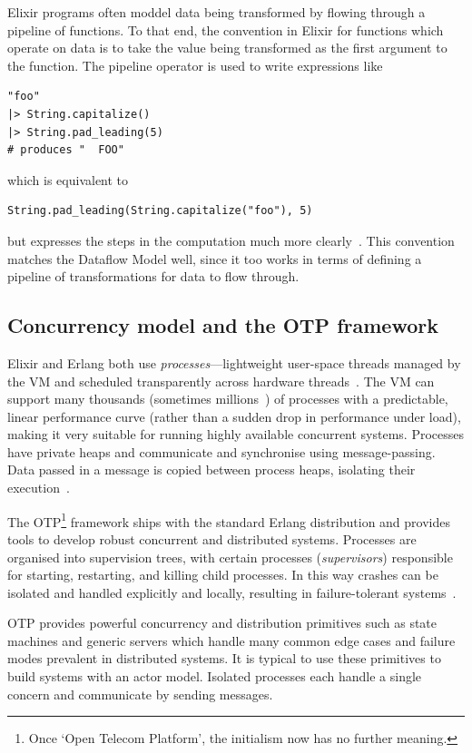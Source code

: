Elixir programs often moddel data being transformed by flowing through a pipeline of functions.
To that end, the convention in Elixir for functions which operate on data is to take the value being transformed as the first argument to the function.
The pipeline operator \exs{|>} is used to write expressions like
\begin{verbatim}
"foo"
|> String.capitalize()
|> String.pad_leading(5)
# produces "  FOO"
\end{verbatim}
which is equivalent to
\begin{verbatim}
String.pad_leading(String.capitalize("foo"), 5)		
\end{verbatim}
but expresses the steps in the computation much more clearly~\cite[p.~56]{Thomas:2016}.
This convention matches the Dataflow Model well, since it too works in terms of defining a pipeline of transformations for data to flow through.

\subsection{Concurrency model and the OTP framework}\label{sec:prep:elixir:otp}

Elixir and Erlang both use \emph{processes}---lightweight user-space threads managed by the VM and scheduled transparently across hardware threads~\cite[p.~185]{Thomas:2016}.
The VM can support many thousands (sometimes millions~\cite{elixir-2million-processes}) of processes with a predictable, linear performance curve (rather than a sudden drop in performance under load), making it very suitable for running highly available concurrent systems.
Processes have private heaps and communicate and synchronise using message-passing.
Data passed in a message is copied between process heaps, isolating their execution~\cite[p.~29]{scalability_erlang_otp}.

The OTP\footnote{
Once `Open Telecom Platform', the initialism now has no further meaning.
} framework ships with the standard Erlang distribution and provides tools to develop robust concurrent and distributed systems.
Processes are organised into supervision trees, with certain processes (\emph{supervisors}) responsible for starting, restarting, and killing child processes.
In this way crashes can be isolated and handled explicitly and locally, resulting in failure-tolerant systems~\cite[p.~169]{scalability_erlang_otp}.

OTP provides powerful concurrency and distribution primitives such as state machines and generic servers which handle many common edge cases and failure modes prevalent in distributed systems.
It is typical to use these primitives to build systems with an actor model.
Isolated processes each handle a single concern and communicate by sending messages.

